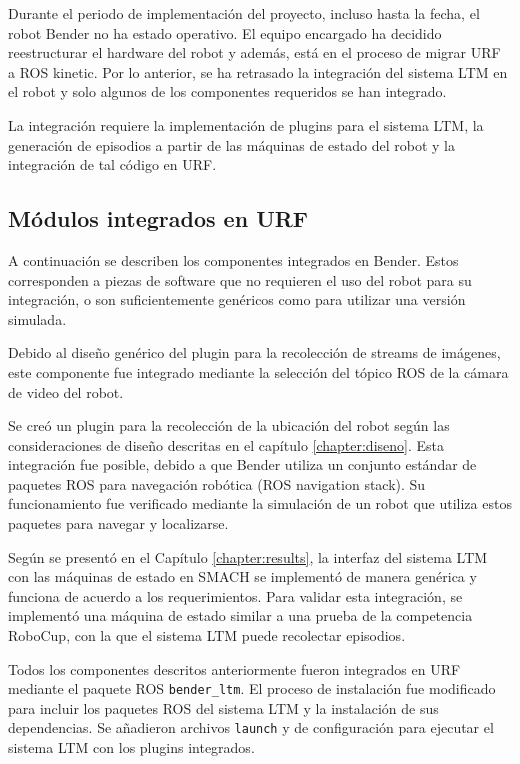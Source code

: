 Durante el periodo de implementación del proyecto, incluso hasta la fecha, el robot Bender no ha estado operativo. El equipo encargado ha decidido reestructurar el hardware del robot y además, está en el proceso de migrar URF a ROS kinetic. Por lo anterior, se ha retrasado la integración del sistema LTM en el robot y solo algunos de los componentes requeridos se han integrado.

La integración requiere la implementación de plugins para el sistema LTM, la generación de episodios a partir de las máquinas de estado del robot y la integración de tal código en URF.

\subsection{Módulos integrados en URF}

A continuación se describen los componentes integrados en Bender. Estos corresponden a piezas de software que no requieren el uso del robot para su integración, o son suficientemente genéricos como para utilizar una versión simulada.

 Debido al diseño genérico del plugin para la recolección de streams de imágenes, este componente fue integrado mediante la selección del tópico ROS de la cámara de video del robot.

 Se creó un plugin para la recolección de la ubicación del robot según las consideraciones de diseño descritas en el capítulo \ref{chapter:diseno}. Esta integración fue posible, debido a que Bender utiliza un conjunto estándar de paquetes ROS para navegación robótica (ROS navigation stack). Su funcionamiento fue verificado mediante la simulación de un robot que utiliza estos paquetes para navegar y localizarse.

 Según se presentó en el Capítulo \ref{chapter:results}, la interfaz del sistema LTM con las máquinas de estado en SMACH se implementó de manera genérica y funciona de acuerdo a los requerimientos. Para validar esta integración, se implementó una máquina de estado similar a una prueba de la competencia RoboCup, con la que el sistema LTM puede recolectar episodios.

 Todos los componentes descritos anteriormente fueron integrados en URF mediante el paquete ROS \texttt{bender\_ltm}. El proceso de instalación fue modificado para incluir los paquetes ROS del sistema LTM y la instalación de sus dependencias. Se añadieron archivos \texttt{launch} y de configuración para ejecutar el sistema LTM con los plugins integrados.

